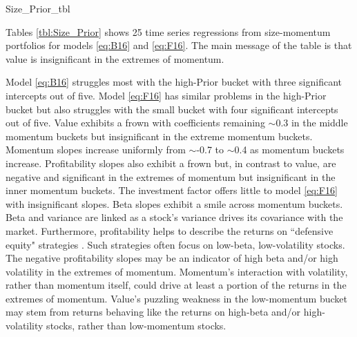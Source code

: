 
{Size_Prior_tbl}

Tables \ref{tbl:Size_Prior} shows 25
time series regressions from size-momentum portfolios for models
\ref{eq:B16} and \ref{eq:F16}.
The main message of the table is that value is insignificant in the extremes
of momentum.

Model \ref{eq:B16} struggles most with the high-Prior bucket with three
significant intercepts out of five.
Model \ref{eq:F16} has similar problems in the high-Prior bucket but also
struggles with the small bucket with four significant intercepts out of five.
Value exhibits a frown with coefficients remaining $\sim$0.3 in the middle
momentum buckets but insignificant in the extreme momentum buckets.
Momentum slopes increase uniformly from $\sim$-0.7 to $\sim$0.4 as momentum
buckets increase.
Profitability slopes also exhibit a frown but, in contrast to value, are
negative and significant in the extremes of momentum but insignificant
in the inner momentum buckets.
The investment factor offers little to model \ref{eq:F16} with insignificant
slopes.
Beta slopes exhibit a smile across momentum buckets. Beta and variance are
linked as a stock's variance drives its covariance with the market.
Furthermore, profitability helps to describe the returns on ``defensive equity"
strategies \parencite{novy2014understanding}.
Such strategies often focus on low-beta, low-volatility stocks.
The negative profitability slopes may be an indicator of high beta and/or
high volatility in the extremes of momentum.
Momentum's interaction with volatility, rather than momentum itself, could
drive at least a portion of the returns in the extremes of momentum.
Value's puzzling weakness in the low-momentum bucket may stem from returns
behaving like the returns on high-beta and/or high-volatility stocks,
rather than low-momentum stocks.

